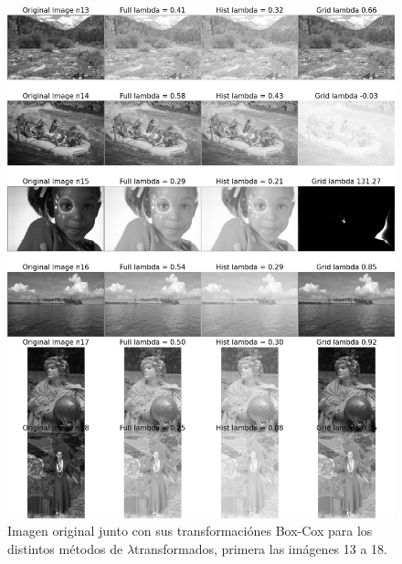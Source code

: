 \begin{figure}
    \centering
    \includegraphics[width=\textwidth]{figuras/img_BCI_all_3.png}
    \caption{Imagen original junto con sus transformaci\'ones Box-Cox para los distintos m\'etodos de $\lambda$transformados, primera las im\'agenes 13 a 18.}
\end{figure}


